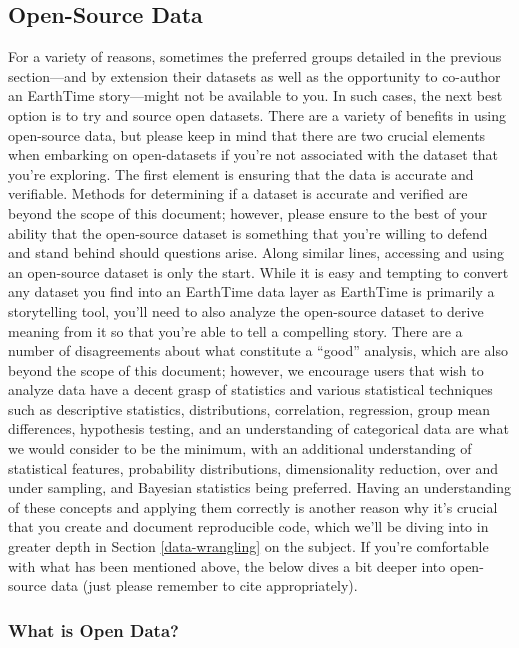 \documentclass[
  12pt,
]{krantz}
\begin{document}
\hypertarget{open-source-data}{%
\subsection{Open-Source Data}\label{open-source-data}}

For a variety of reasons, sometimes the preferred groups detailed in the previous section---and by extension their datasets as well as the opportunity to co-author an EarthTime story---might not be available to you. In such cases, the next best option is to try and source open datasets. There are a variety of benefits in using open-source data, but please keep in mind that there are two crucial elements when embarking on open-datasets if you're not associated with the dataset that you're exploring. The first element is ensuring that the data is accurate and verifiable. Methods for determining if a dataset is accurate and verified are beyond the scope of this document; however, please ensure to the best of your ability that the open-source dataset is something that you're willing to defend and stand behind should questions arise. Along similar lines, accessing and using an open-source dataset is only the start. While it is easy and tempting to convert any dataset you find into an EarthTime data layer as EarthTime is primarily a storytelling tool, you'll need to also analyze the open-source dataset to derive meaning from it so that you're able to tell a compelling story. There are a number of disagreements about what constitute a ``good'' analysis, which are also beyond the scope of this document; however, we encourage users that wish to analyze data have a decent grasp of statistics and various statistical techniques such as descriptive statistics, distributions, correlation, regression, group mean differences, hypothesis testing, and an understanding of categorical data are what we would consider to be the minimum, with an additional understanding of statistical features, probability distributions, dimensionality reduction, over and under sampling, and Bayesian statistics being preferred. Having an understanding of these concepts and applying them correctly is another reason why it's crucial that you create and document reproducible code, which we'll be diving into in greater depth in Section \ref{data-wrangling} on the subject. If you're comfortable with what has been mentioned above, the below dives a bit deeper into open-source data (just please remember to cite appropriately).

\hypertarget{what-is-open-data}{%
\subsubsection*{What is Open Data?}\label{what-is-open-data}}
\end{document}

